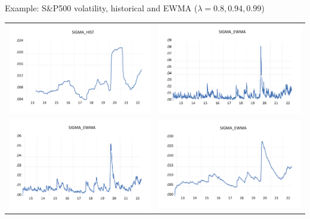 \begin{frame}%

\begin{block}{Example: S\&P500 volatility, historical and EWMA ($\lambda = 0.8,0.94,0.99$)}
\begin{tabular}{cc}
\includegraphics[width=.4\textwidth]{historical}&
\includegraphics[width=.4\textwidth]{EWMA08}\\
\includegraphics[width=.4\textwidth]{EWMA94}&
\includegraphics[width=.4\textwidth]{EWMA99}
\end{tabular}
\end{block}

\end{frame}%

